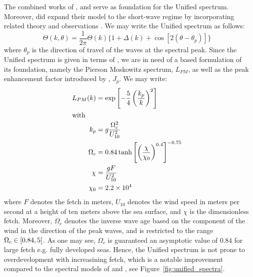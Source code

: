 The combined works of \citet{article:Hasselman1973}, \citet{article:Mitsuyasu1975}
and \citet{article:Donelan1985} serve as foundation for the Unified spectrum. 
Moreover, \citeauthor{article:Elfouhaily1997} did expand their model to the
short-wave regime by incorporating related theory \citep{book:Kitaigorodskii1970,
article:Phillips1985} and observations \citep{article:CoxMunk1954,article:Jaehne1990a,
article:Hara1994}. We may write the Unified spectrum as follows:
%
\begin{equation}
 \Theta(k, \theta) = \frac{1}{2\pi}\Theta(k)\{1 + \Delta(k) + \cos[2(\theta - \theta_p)]\}
\end{equation}
%
where $\theta_p$ is the direction of travel of the waves at the spectral peak. 
Since the Unified spectrum is given in terms of \wavenumber, we are in need of a 
\wavenumber based formulation of its foundation, namely the Pierson Moskowitz 
spectrum, $L_{PM}$, as well as the peak enhancement factor introduced by 
\citeauthor{article:Hasselman1973}, $J_p$. We may write:
%
\begin{subequations}
\begin{align}
L_{PM}(k) &= \exp\left[-\frac{5}{4} \left(\frac{k_p}{k}\right)^2 \right] \\
\intertext{with}
k_p &= g\frac{\Omega_c^2}{U_{10}^2} \\
\Omega_c &= 0.84 \tanh\left[\left(\frac{\chi}{\chi_0}\right)^{0.4}\right]^{-0.75} \\
\chi &= \frac{gF}{U_{10}^{2}} \\
\chi_0 &= 2.2 \times 10^4
\end{align}
\end{subequations}
%
where $F$ denotes the fetch in meters, $U_{10}$ denotes the wind speed in 
meters per second at a height of ten meters above the sea surface, and $\chi$ 
is the dimensionless fetch.
Moreover, $\Omega_c$ denotes the inverse wave age based on the 
component of the wind in the direction of the peak waves,
and is restricted to 
the range $\Omega_c \in \interval[open right]{0.84}{5}$. As one may see, 
$\Omega_c$ is guaranteed an asymptotic value of $0.84$ for large fetch e.g. 
fully developed seas. Hence, the Unified spectrum is not prone to 
overdevelopment with increasining fetch, which is a notable improvement 
compared to the spectral models of \citeauthor{article:Hasselman1973}
and \citeauthor{article:Donelan1985}, see Figure~\ref{fig:unified_spectra}.
